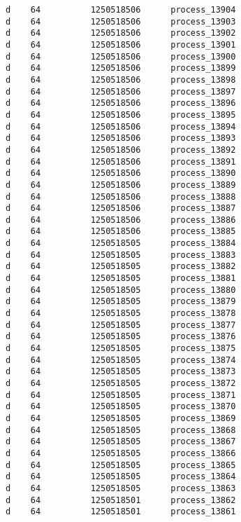 \begin{footnotesize}
\begin{verbatim}
d 	 64 		 1250518506 	 process_13904 
d 	 64 		 1250518506 	 process_13903 
d 	 64 		 1250518506 	 process_13902 
d 	 64 		 1250518506 	 process_13901 
d 	 64 		 1250518506 	 process_13900 
d 	 64 		 1250518506 	 process_13899 
d 	 64 		 1250518506 	 process_13898 
d 	 64 		 1250518506 	 process_13897 
d 	 64 		 1250518506 	 process_13896 
d 	 64 		 1250518506 	 process_13895 
d 	 64 		 1250518506 	 process_13894 
d 	 64 		 1250518506 	 process_13893 
d 	 64 		 1250518506 	 process_13892 
d 	 64 		 1250518506 	 process_13891 
d 	 64 		 1250518506 	 process_13890 
d 	 64 		 1250518506 	 process_13889 
d 	 64 		 1250518506 	 process_13888 
d 	 64 		 1250518506 	 process_13887 
d 	 64 		 1250518506 	 process_13886 
d 	 64 		 1250518506 	 process_13885 
d 	 64 		 1250518505 	 process_13884 
d 	 64 		 1250518505 	 process_13883 
d 	 64 		 1250518505 	 process_13882 
d 	 64 		 1250518505 	 process_13881 
d 	 64 		 1250518505 	 process_13880 
d 	 64 		 1250518505 	 process_13879 
d 	 64 		 1250518505 	 process_13878 
d 	 64 		 1250518505 	 process_13877 
d 	 64 		 1250518505 	 process_13876 
d 	 64 		 1250518505 	 process_13875 
d 	 64 		 1250518505 	 process_13874 
d 	 64 		 1250518505 	 process_13873 
d 	 64 		 1250518505 	 process_13872 
d 	 64 		 1250518505 	 process_13871 
d 	 64 		 1250518505 	 process_13870 
d 	 64 		 1250518505 	 process_13869 
d 	 64 		 1250518505 	 process_13868 
d 	 64 		 1250518505 	 process_13867 
d 	 64 		 1250518505 	 process_13866 
d 	 64 		 1250518505 	 process_13865 
d 	 64 		 1250518505 	 process_13864 
d 	 64 		 1250518505 	 process_13863 
d 	 64 		 1250518501 	 process_13862 
d 	 64 		 1250518501 	 process_13861 


\end{verbatim}
\end{footnotesize}
